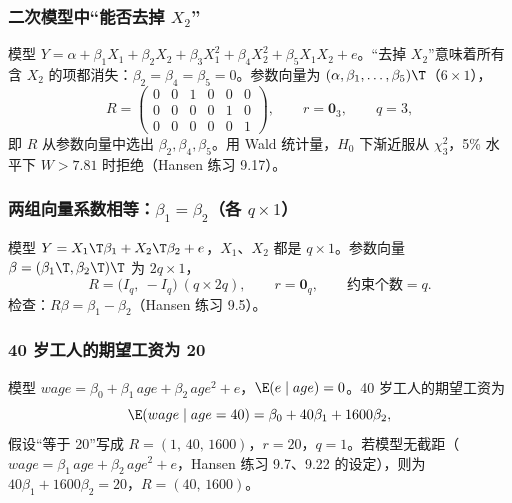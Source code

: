 \subsubsection{二次模型中“能否去掉 \texorpdfstring{$X_2$}{X2}”}

模型 $Y=\alpha+\beta_1X_1+\beta_2X_2+\beta_3X_1^2+\beta_4X_2^2+\beta_5X_1X_2+e$。“去掉 $X_2$”意味着所有含 $X_2$ 的项都消失：$\beta_2=\beta_4=\beta_5=0$。参数向量为 $(\alpha,\beta_1,\dots,\beta_5)\T$（$6\times1$），
\[
R=\begin{pmatrix}0&0&1&0&0&0\\0&0&0&0&1&0\\0&0&0&0&0&1\end{pmatrix},\qquad r=\mathbf 0_3,\qquad q=3 ,
\]
即 $R$ 从参数向量中选出 $\beta_2,\beta_4,\beta_5$。用 Wald 统计量，$H_0$ 下渐近服从 $\chi^2_3$，5\% 水平下 $W>7.81$ 时拒绝（Hansen 练习 9.17）。

\subsubsection{两组向量系数相等：\texorpdfstring{$\beta_1=\beta_2$}{beta1 = beta2}（各 \texorpdfstring{$q\times1$}{q x 1}）}

模型 $Y=X_1\T\beta_1+X_2\T\beta_2+e$，$X_1$、$X_2$ 都是 $q\times1$。参数向量 $\beta=(\beta_1\T,\beta_2\T)\T$ 为 $2q\times1$，
\[
R=\bigl(I_q,\ -I_q\bigr)\ (q\times2q),\qquad r=\mathbf 0_q,\qquad \text{约束个数}=q .
\]
检查：$R\beta=\beta_1-\beta_2$（Hansen 练习 9.5）。

\subsubsection{40 岁工人的期望工资为 20}

模型 $wage=\beta_0+\beta_1\,age+\beta_2\,age^2+e$，$\E(e\mid age)=0$。40 岁工人的期望工资为
\[
\E(wage\mid age=40)=\beta_0+40\beta_1+1600\beta_2 ,
\]
假设“等于 20”写成 $R=(1,\,40,\,1600)$，$r=20$，$q=1$。若模型无截距（$wage=\beta_1\,age+\beta_2\,age^2+e$，Hansen 练习 9.7、9.22 的设定），则为 $40\beta_1+1600\beta_2=20$，$R=(40,\,1600)$。

